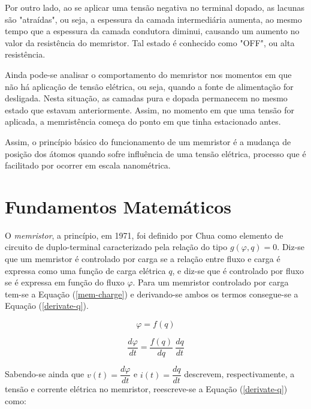 \documentclass{ceel}
\begin{document}
\begin{multicols}{2}
Por outro lado, ao se aplicar uma tensão negativa no terminal dopado, as lacunas são "atraídas", ou seja, a espessura da camada intermediária aumenta, ao mesmo tempo que a espessura 
da camada condutora diminui, causando um aumento no valor da resistência do memristor. Tal estado é conhecido como "OFF", ou alta resistência. 

Ainda pode-se analisar o comportamento do memristor nos momentos em que não há aplicação de tensão elétrica, ou seja, quando a fonte de alimentação for desligada. Nesta situação, as 
camadas pura e dopada permanecem no mesmo estado que estavam anteriormente. Assim, no momento em que uma tensão for aplicada, a memristência começa do ponto em que tinha 
estacionado antes. %

Assim, o princípio básico do funcionamento de um memristor é a mudança de posição dos átomos quando sofre influência de uma tensão elétrica, processo que é facilitado por ocorrer em 
escala nanométrica. %

\section{Fundamentos Matemáticos}\label{analise-matematica}
O \emph{memristor}, a princípio, em 1971, foi definido por Chua \cite{artigo} como elemento de circuito de duplo-terminal caracterizado pela relação do tipo $g(\varphi, q)=0$. Diz-se que 
um memristor é controlado por carga se a relação entre fluxo e carga é expressa como uma função de carga elétrica $q$, e diz-se que é controlado por fluxo se é expressa em função do 
fluxo $\varphi$. Para um memristor controlado por carga tem-se a Equação (\ref{mem-charge}) e derivando-se ambos os termos consegue-se a Equação (\ref{derivate-q}).

\begin{equation}\label{mem-charge}
\varphi = f(q)
\end{equation}

\begin{equation}\label{derivate-q}
\dfrac{d\varphi}{dt}=\dfrac{f(q)}{dq} \ \dfrac{dq}{dt}
\end{equation}
\vspace{0.1cm}

Sabendo-se ainda que $v(t)=\dfrac{d\varphi}{dt}$ e $i(t)=\dfrac{dq}{dt}$ descrevem, respectivamente, a tensão e corrente elétrica no memristor, 
reescreve-se a Equação (\ref{derivate-q}) como:


\end{multicols}
\end{document}
